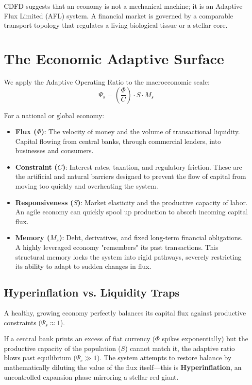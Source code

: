 \documentclass[11pt,a4paper]{article}
\begin{document}
CDFD suggests that an economy is not a mechanical machine; it is an Adaptive Flux Limited (AFL) system. A financial market is governed by a comparable transport topology that regulates a living biological tissue or a stellar core.

\section{The Economic Adaptive Surface}
We apply the Adaptive Operating Ratio to the macroeconomic scale:
\begin{equation}
    \Psi_s = \left( \frac{\Phi}{C} \right) \cdot S \cdot M_s
\end{equation}

For a national or global economy:
\begin{itemize}
    \item \textbf{Flux ($\Phi$)}: The velocity of money and the volume of transactional liquidity. Capital flowing from central banks, through commercial lenders, into businesses and consumers.
    \item \textbf{Constraint ($C$)}: Interest rates, taxation, and regulatory friction. These are the artificial and natural barriers designed to prevent the flow of capital from moving too quickly and overheating the system.
    \item \textbf{Responsiveness ($S$)}: Market elasticity and the productive capacity of labor. An agile economy can quickly spool up production to absorb incoming capital flux.
    \item \textbf{Memory ($M_s$)}: Debt, derivatives, and fixed long-term financial obligations. A highly leveraged economy "remembers" its past transactions. This structural memory locks the system into rigid pathways, severely restricting its ability to adapt to sudden changes in flux.
\end{itemize}

\subsection{Hyperinflation vs. Liquidity Traps}
A healthy, growing economy perfectly balances its capital flux against productive constraints ($\Psi_s \approx 1$).

If a central bank prints an excess of fiat currency ($\Phi$ spikes exponentially) but the productive capacity of the population ($S$) cannot match it, the adaptive ratio blows past equilibrium ($\Psi_s \gg 1$). The system attempts to restore balance by mathematically diluting the value of the flux itself---this is \textbf{Hyperinflation}, an uncontrolled expansion phase mirroring a stellar red giant.
\end{document}
